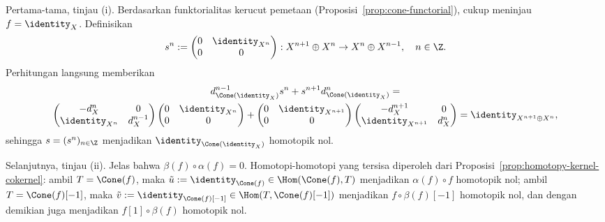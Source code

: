 \begin{bukti}
	Pertama-tama, tinjau (i). Berdasarkan funktorialitas kerucut pemetaan
	(Proposisi~\ref{prop:cone-functorial}), cukup meninjau
	$f=\identity_X$. Definisikan
	\[ s^n := \begin{pmatrix} 0 & \identity_{X^n} \\ 0 & 0 \end{pmatrix} : X^{n+1} \oplus X^n \to X^n \oplus X^{n-1}, \quad n \in \Z. \]
	Perhitungan langsung memberikan
	\begin{multline*}
		d^{n-1}_{\Cone(\identity_X)} s^n + s^{n+1} d^n_{\Cone(\identity_X)} = \\
		\begin{pmatrix} -d_X^n & 0 \\ \identity_{X^n} & d_X^{n-1} \end{pmatrix} \begin{pmatrix} 0 & \identity_{X^n} \\ 0 & 0 \end{pmatrix}  + \begin{pmatrix} 0 & \identity_{X^{n+1}} \\ 0 & 0 \end{pmatrix} \begin{pmatrix} -d_X^{n+1} & 0 \\ \identity_{X^{n+1}} & d_X^n \end{pmatrix}
		= \identity_{X^{n+1} \oplus X^n},
	\end{multline*}
	sehingga $s=(s^n)_{n\in\Z}$ menjadikan
	$\identity_{\Cone(\identity_X)}$ homotopik nol.

	Selanjutnya, tinjau (ii). Jelas bahwa
	$\beta(f)\circ\alpha(f)=0$. Homotopi-homotopi yang tersisa diperoleh dari
	Proposisi~\ref{prop:homotopy-kernel-cokernel}: ambil $T=\Cone(f)$, maka
	$\tilde{u}:=\identity_{\Cone(f)}\in\Hom(\Cone(f),T)$ menjadikan
	$\alpha(f)\circ f$ homotopik nol; ambil $T=\Cone(f)[-1]$, maka
	$\tilde{v}:=\identity_{\Cone(f)[-1]}\in\Hom(T,\Cone(f)[-1])$ menjadikan
	$f\circ\beta(f)[-1]$ homotopik nol, dan dengan demikian juga menjadikan
	$f[1]\circ\beta(f)$ homotopik nol.
\end{bukti}

